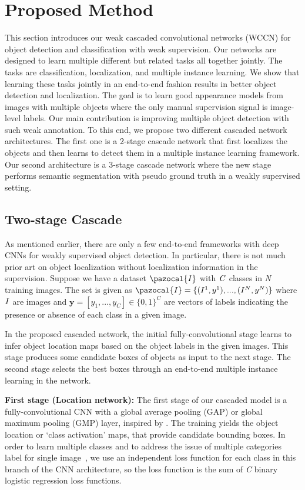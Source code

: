 \documentclass[10pt,twocolumn,letterpaper]{article}
\newcommand{\Ib}{\pazocal{I}}
\begin{document}
\section{Proposed Method}

This section introduces our weak cascaded convolutional networks (WCCN) for object detection and classification with weak supervision. Our networks are designed to learn multiple different but related tasks all together jointly. The tasks are classification, localization, and multiple instance learning. We show that learning these tasks jointly in an end-to-end fashion results in better object detection and localization. The goal is to learn good appearance models from images with multiple objects where the only manual supervision signal is image-level labels. Our main contribution is improving multiple object detection with such weak annotation. To this end, we propose two different cascaded network architectures. The first one is a 2-stage cascade network that first localizes the objects and then learns to detect them in a multiple instance learning framework. Our second architecture is a 3-stage cascade network where the new stage performs semantic segmentation with pseudo ground truth in a weakly supervised setting.

\subsection{Two-stage Cascade}
As mentioned earlier, there are only a few end-to-end frameworks with deep CNNs for weakly supervised object detection. In particular, there is not much prior art on object localization without localization information in the supervision. 
Suppose we have a dataset $\it{\Ib}$ with $\it{C}$ classes in \textit{N} training images. The set is given as $\Ib=\{(I^1,y^1),..., (I^N,y^N) \}$ where $\it{I}$ are images and $\mathbf{y} = [y_{1},..., y_{C}] \in \{0,1\}^C$ are vectors of labels indicating the presence or absence of each class in a given image.

In the proposed cascaded network, the initial fully-convolutional stage learns to infer object location maps based on the object labels in the given images. This stage produces some candidate boxes of objects as input to the next stage. The second stage selects the best boxes through an end-to-end multiple instance learning in the network. 

\textbf{First stage (Location network):} The first stage of our cascaded model is a fully-convolutional CNN with a global average pooling (GAP) or global maximum pooling (GMP) layer, inspired by \cite{gap_paper}. The training yields the object location or `class activation' maps, that provide candidate bounding boxes. 
In order to learn multiple classes and to address the issue of multiple categories label for single image~\cite{laptev15}, we use an independent loss function for each class in this branch of the CNN architecture, so the loss function is the sum of \textit{C} binary logistic regression loss functions.
\end{document}
